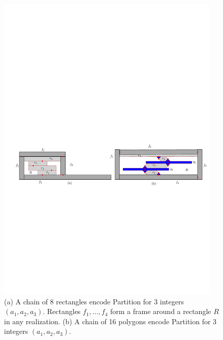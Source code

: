 \documentclass[runningheads]{article}
\begin{document}
\begin{figure}[htbp]
  \centering
 \includegraphics[width=0.95\textwidth]{fig-chains}
\caption{\small (a) A chain of 8 rectangles encode {\sc Partition} for 3 integers $(a_1,a_2,a_3)$.
Rectangles $f_1,\ldots, f_4$ form a frame around a rectangle $R$ in any realization.
(b) A chain of 16 polygons encode {\sc Partition} for 3 integers $(a_1,a_2,a_3)$.}
\label{fig:chain}
\end{figure}
\end{document}
